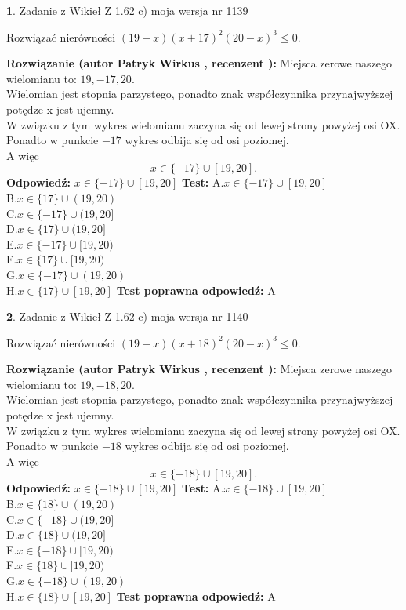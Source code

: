 \documentclass[12pt, a4paper]{article}
\theoremstyle{definition} %
\newtheorem{zad}{}
\newcommand{\zadStart}[1]{\begin{zad}#1\newline}
\newcommand{\zadStop}{\end{zad}}
\newcommand{\rozwStart}[2]{\noindent \textbf{Rozwiązanie (autor #1 , recenzent #2): }\newline}
\newcommand{\rozwStop}{\newline}
\newcommand{\odpStart}{\noindent \textbf{Odpowiedź:}\newline}
\newcommand{\odpStop}{\newline}
\newcommand{\testStart}{\noindent \textbf{Test:}\newline}
\newcommand{\testStop}{\newline}
\newcommand{\kluczStart}{\noindent \textbf{Test poprawna odpowiedź:}\newline}
\newcommand{\kluczStop}{\newline}
\begin{document}
\zadStart{Zadanie z Wikieł Z 1.62 c) moja wersja nr 1139}

Rozwiązać nierówności $(19-x)(x+17)^{2}(20-x)^{3}\le0$.
\zadStop
\rozwStart{Patryk Wirkus}{}
Miejsca zerowe naszego wielomianu to: $19, -17, 20$.\\
Wielomian jest stopnia parzystego, ponadto znak współczynnika przy\linebreak najwyższej potędze x jest ujemny.\\ W związku z tym wykres wielomianu zaczyna się od lewej strony powyżej osi OX.\\
Ponadto w punkcie $-17$ wykres odbija się od osi poziomej.\\
A więc $$x \in \{-17\} \cup [19,20].$$
\rozwStop
\odpStart
$x \in \{-17\} \cup [19,20]$
\odpStop
\testStart
A.$x \in \{-17\} \cup [19,20]$\\
B.$x \in \{17\} \cup (19,20)$\\
C.$x \in \{-17\} \cup (19,20]$\\
D.$x \in \{17\} \cup (19,20]$\\
E.$x \in \{-17\} \cup [19,20)$\\
F.$x \in \{17\} \cup [19,20)$\\
G.$x \in \{-17\} \cup (19,20)$\\
H.$x \in \{17\} \cup [19,20]$
\testStop
\kluczStart
A
\kluczStop



\zadStart{Zadanie z Wikieł Z 1.62 c) moja wersja nr 1140}

Rozwiązać nierówności $(19-x)(x+18)^{2}(20-x)^{3}\le0$.
\zadStop
\rozwStart{Patryk Wirkus}{}
Miejsca zerowe naszego wielomianu to: $19, -18, 20$.\\
Wielomian jest stopnia parzystego, ponadto znak współczynnika przy\linebreak najwyższej potędze x jest ujemny.\\ W związku z tym wykres wielomianu zaczyna się od lewej strony powyżej osi OX.\\
Ponadto w punkcie $-18$ wykres odbija się od osi poziomej.\\
A więc $$x \in \{-18\} \cup [19,20].$$
\rozwStop
\odpStart
$x \in \{-18\} \cup [19,20]$
\odpStop
\testStart
A.$x \in \{-18\} \cup [19,20]$\\
B.$x \in \{18\} \cup (19,20)$\\
C.$x \in \{-18\} \cup (19,20]$\\
D.$x \in \{18\} \cup (19,20]$\\
E.$x \in \{-18\} \cup [19,20)$\\
F.$x \in \{18\} \cup [19,20)$\\
G.$x \in \{-18\} \cup (19,20)$\\
H.$x \in \{18\} \cup [19,20]$
\testStop
\kluczStart
A
\kluczStop
\end{document}
